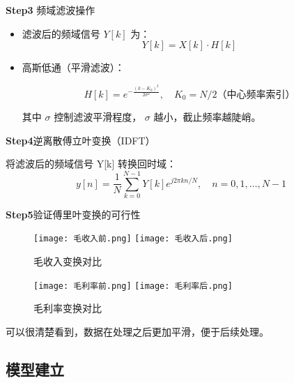 \documentclass[withoutpreface,bwprint]{cumcmthesis}
\begin{document}
\textbf{Step3} 频域滤波操作
\par
\begin{itemize}[itemindent=2em]

\item 滤波后的频域信号  $Y[k] $ 为：
\begin{equation}
\label{eq:公式1}
Y[k] = X[k] \cdot H[k]
\end{equation}
\par
\item 高斯低通（平滑滤波）：

\begin{equation}
\label{eq:公式1}
H[k] = e^{-\frac{(k-K_0)^2}{2\sigma^2}}, \quad K_0 = N/2 \text{（中心频率索引）}
\end{equation}
\par
其中  $\sigma$  控制滤波平滑程度， $\sigma$  越小，截止频率越陡峭。
\end{itemize}

\par
\textbf{Step4}逆离散傅立叶变换（IDFT）
\par
将滤波后的频域信号  Y[k]  转换回时域：
\begin{equation}
\label{eq:公式1}
y[n] = \frac{1}{N} \sum_{k=0}^{N-1} Y[k] e^{j2\pi kn/N}, \quad n = 0, 1, \dots, N-1
\end{equation}
\par

\textbf{Step5}验证傅里叶变换的可行性
\par
\begin{figure}[H]
\centering
{}
{\texttt{[image: 毛收入前.png]}}
{\texttt{[image: 毛收入后.png]}}
\caption{毛收入变换对比}\label{fig:双图}
\end{figure} 

\begin{figure}[H]
\centering
{}
{\texttt{[image: 毛利率前.png]}}
{\texttt{[image: 毛利率后.png]}}
\caption{毛利率变换对比}\label{fig:双图}
\end{figure} 
可以很清楚看到，数据在处理之后更加平滑，便于后续处理。

\subsection{模型建立}
\end{document}
